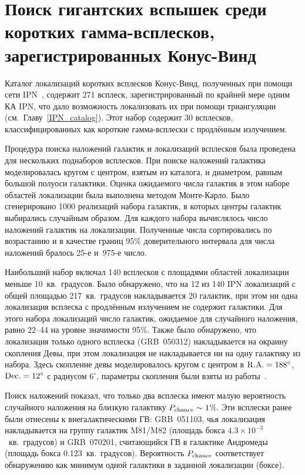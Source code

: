 \section{Поиск гигантских вспышек среди коротких гамма-всплесков, 
зарегистрированных Конус-Винд}\label{GF_search}

Каталог локализаций коротких всплесков Конус-Винд, полученных при помощи 
сети IPN~\citep{Palshin2013}, содержит 271 всплеск, зарегистрированный 
по крайней мере одним КА IPN, что дало возможность локализовать их при помощи 
триангуляции (см.~Главу~\ref{IPN_catalog}). Этот набор содержит 30 всплесков, 
классифицированных как короткие гамма-всплески с продлённым излучением.

Процедура поиска наложений галактик и локализаций всплесков была проведена 
для нескольких поднаборов всплесков.  При поиске наложений галактика моделировалась 
кругом с центром, взятым из каталога, и диаметром, равным большой полуоси галактики. 
Оценка ожидаемого числа галактик в этом наборе областей локализации была выполнена 
методом Монте-Карло. Было сгенерировано 1000 реализаций набора галактик, в которых 
центры галактик выбирались случайным образом. Для каждого набора вычислялось число 
наложений галактик на локализации. Полученные числа сортировались по возрастанию 
и в качестве границ 95\% доверительного интервала для числа наложений 
бралось 25-е и~975-е число.

Наибольший набор включал 140 всплесков с площадями областей локализации 
меньше 10~кв.~градусов.
Было обнаружено, что на 12 из 140 IPN локализаций с общей площадью 217~кв.~градусов 
накладывается 20 галактик, при этом ни одна локализация всплеска с продлённым 
излучением не содержит галактики. Для этого набора локализаций число галактик, 
ожидаемое для случайного наложения, равно 22--44 на уровне значимости 95\%. 
Также было обнаружено, что локализация только одного всплеска (GRB~050312) 
накладывается на окраину скопления Девы, при этом локализация не накладывается 
ни на одну галактику из набора. Здесь скопление девы моделировалось кругом с центром в 
${\mathrm{R.A.}}=188^\circ$, ${\mathrm{Dec.}}=12^\circ$ с радиусом $6^\circ$, 
параметры скопления были взяты из работы~\citep{Binggeli1987}.

Поиск наложений показал, что только два всплеска имеют малую вероятность случайного 
наложения на близкую галактику $P_{\mathrm{chance}} \sim 1$\%. Эти всплески ранее были 
отнесены к внегалактическими ГВ: GRB~051103, чья локализация накладывается на группу галактик M81/M82 
(площадь бокса $4.3\times10^{-3}$~кв.~градусов) и GRB~070201, считающийся ГВ в галактике 
Андромеды (площадь бокса 0.123~кв.~градусов). Вероятность $P_{{\mathrm{chance}}}$ 
соответствует обнаружению как минимум одной галактики в заданной локализации (боксе).


